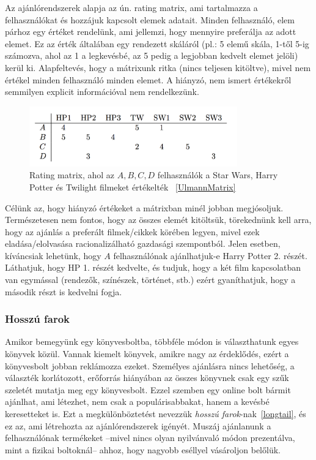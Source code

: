 \documentclass[a4paper,12pt]{article}
\begin{document}
Az ajánlórendszerek alapja az ún. rating matrix, ami tartalmazza a felhasználókat és hozzájuk kapcsolt elemek adatait. Minden felhasználó, elem párhoz egy értéket rendelünk, ami jellemzi, hogy mennyire preferálja az adott elemet. Ez az érték általában egy rendezett skáláról (pl.: 5 elemű skála, 1-től 5-ig számozva, ahol az 1 a legkevésbé, az 5 pedig a legjobban kedvelt elemet jelöli) kerül ki. Alapfeltevés, hogy a mátrixunk ritka (nincs teljesen kitöltve), mivel nem értékel minden felhasználó minden elemet. A hiányzó, nem ismert értékekről semmilyen explicit információval nem rendelkezünk.

\begin{figure}[ht!]
\centering
\includegraphics[width=90mm]{img/um.png}
\caption{Rating matrix, ahol az $A,B, C, D$ felhasználók a Star Wars, Harry Potter és Twilight filmeket értékelték ~\ref{UlmannMatrix} \label{um}}
\end{figure}

Célünk az, hogy hiányzó értékeket a mátrixban minél jobban megjósoljuk. Természetesen nem fontos, hogy az összes elemét kitöltsük, törekednünk kell arra, hogy az ajánlás a preferált filmek/cikkek körében legyen, mivel ezek eladása/elolvasása racionalizálható gazdasági szempontból. Jelen esetben, kíváncsiak lehetünk, hogy $A$ felhasználónak ajánlhatjuk-e Harry Potter 2. részét. Láthatjuk, hogy HP 1. részét kedvelte, és tudjuk, hogy a két film kapcsolatban van egymással (rendezők, színészek, történet, stb.) ezért gyaníthatjuk, hogy a második részt is kedvelni fogja.

\subsubsection{Hosszú farok}

Amikor bemegyünk egy könyvesboltba, többféle módon is választhatunk egyes könyvek közül. Vannak kiemelt könyvek, amikre nagy az érdeklődés, ezért a könyvesbolt jobban reklámozza ezeket. Személyes ajánlásra nincs lehetőség, a választék korlátozott, erőforrás hiányában az összes könyvnek csak egy szűk szeletét mutatja meg egy könyvesbolt. Ezzel szemben egy online bolt bármit ajánlhat, ami létezhet, nem csak a populárisabbakat, hanem a kevésbé keresetteket is. Ezt a megkülönböztetést nevezzük \textsl{hosszú farok}-nak~\ref{longtail}, és ez az, ami létrehozta az ajánlórendszerek igényét. Muszáj ajánlanunk a felhasználónak termékeket --mivel nincs olyan nyilvánvaló módon prezentálva, mint a fizikai boltoknál-- ahhoz, hogy nagyobb eséllyel vásároljon belőlük.
\end{document}
